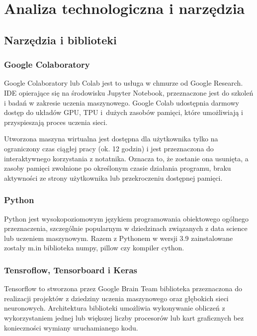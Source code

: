 \chapter{Analiza technologiczna i narzędzia}
\section{Narzędzia i biblioteki}
\subsection{Google Colaboratory}

\hspace{0.5cm}
Google Colaboratory lub Colab jest to usługa w chmurze od Google Research. IDE opierające się na środowisku Jupyter Notebook, przeznaczone jest do szkoleń i badań w zakresie uczenia maszynowego. Google Colab udostępnia darmowy dostęp do układów GPU, TPU i~dużych zasobów pamięci, które umożliwiają i przyspieszają proces uczenia sieci.

Utworzona maszyna wirtualna jest dostępna dla użytkownika tylko na ograniczony czas ciągłej pracy (ok. 12 godzin) i jest przeznaczona do interaktywnego korzystania z notatnika. Oznacza to, że zostanie ona usunięta, a zasoby pamięci zwolnione po określonym czasie działania programu, braku aktywności ze strony użytkownika lub przekroczeniu dostępnej pamięci. 


\subsection{Python}
\hspace{0.5cm}
Python jest wysokopoziomowym językiem programowania obiektowego ogólnego przeznaczenia, szczególnie popularnym w dziedzinach związanych z data science lub uczeniem maszynowym. Razem z Pythonem w wersji 3.9 zainstalowane zostały m.in biblioteka numpy, pillow czy kompiler cython.

\subsection{Tensroflow, Tensorboard i Keras}

\hspace{0.5cm}
Tensorflow to stworzona przez Google Brain Team biblioteka przeznaczona do realizacji projektów z dziedziny uczenia maszynowego oraz głębokich sieci neuronowych. Architektura biblioteki umożliwia wykonywanie obliczeń z wykorzystaniem jednej lub większej liczby procesorów lub kart graficznych bez konieczności wymiany uruchamianego kodu.

